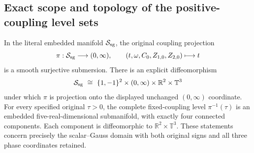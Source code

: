 \subsection{Exact scope and topology of the positive-coupling level sets}

\begin{corollary}
\label{sgd:smooth-addon:levels}
In the literal embedded manifold $\mathcal S_{\rm sg}$, the
original coupling projection
\[
 \pi:\mathcal S_{\rm sg}\longrightarrow(0,\infty),\qquad
 (t,\omega,C_0,Z_{1,0},Z_{2,0})\longmapsto t
\]
is a smooth surjective submersion. There is an explicit diffeomorphism
\begin{equation}
 \mathcal S_{\rm sg}
 \ \cong\
 \{1,-1\}^2\times(0,\infty)\times\mathbb R^2\times\mathbb T^3
 \label{sgd:smooth-addon:global-product}
\end{equation}
under which $\pi$ is projection onto the displayed unchanged
$(0,\infty)$ coordinate.
For every specified original $\tau>0$, the complete fixed-coupling
level $\pi^{-1}(\tau)$ is an embedded five-real-dimensional
submanifold, with exactly four connected components.
Each component is diffeomorphic to $\mathbb R^2\times\mathbb T^3$.
These statements concern precisely the scalar--Gauss domain with
both original signs and all three phase coordinates retained.
\end{corollary}
